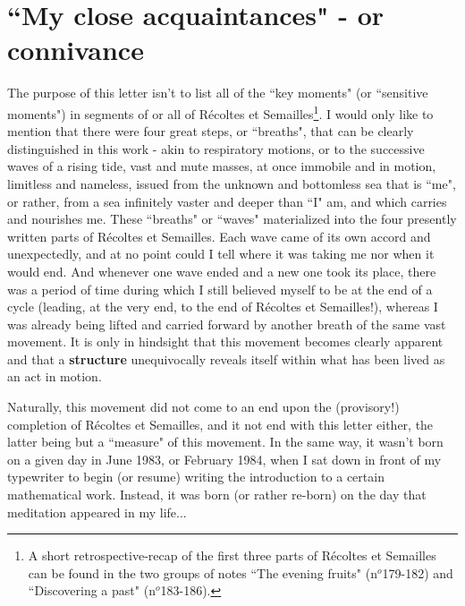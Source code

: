 \section{``My close acquaintances" - or connivance}

The purpose of this letter isn't to list all of the ``key moments" (or ``sensitive moments") in segments of or all of  R\'ecoltes et Semailles\footnote{A short retrospective-recap of the first three parts of R\'ecoltes et Semailles can be found in the two groups of notes ``The evening fruits" (n$^o$179-182) and ``Discovering a past" (n$^o$183-186).}.
I would only like to mention that there were four great steps, or ``breaths", that can be clearly distinguished in this work - akin to respiratory motions, or to the successive waves of a rising tide, vast and mute masses, at once immobile and in motion, limitless and nameless, issued from the unknown and bottomless sea that is ``me", or rather, from a sea infinitely vaster and deeper than ``I" am, and which carries and nourishes me. These ``breaths" or ``waves" materialized into the four presently written parts of R\'ecoltes et Semailles. Each wave came of its own accord and unexpectedly, and at no point could I tell where it was taking me nor when it would end. And whenever one wave ended and a new one took its place, there was a period of time during which I still believed myself to be at the end of a cycle (leading, at the very end, to the end of R\'ecoltes et Semailles!), whereas I was already being lifted and carried forward by another breath of the same vast movement. It is only in hindsight that this movement becomes clearly apparent and that a \textbf{structure} unequivocally reveals itself within what has been lived as an act in motion.

Naturally, this movement did not come to an end upon the (provisory!) completion of R\'ecoltes et Semailles, and it not end with this letter either, the latter being but a ``measure" of this movement. In the same way, it wasn't born on a given day in June 1983, or February 1984, when I sat down in front of my typewriter to begin (or resume) writing the introduction to a certain mathematical work. Instead, it was born (or rather re-born) on the day that meditation appeared in my life...

